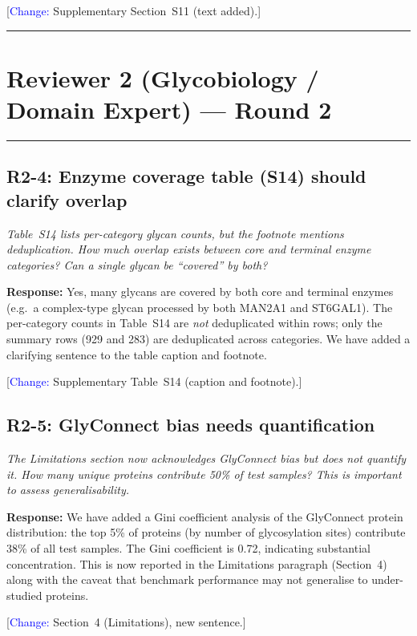 \documentclass[11pt,a4paper]{article}
\newcommand{\reviewercomment}[1]{\textit{\color{black!70}#1}}
\newcommand{\response}[1]{\textbf{Response:} #1}
\newcommand{\change}[1]{[\textcolor{blue}{Change:} #1]}
\begin{document}
\change{Supplementary Section~S11 (text added).}

\vspace{1em}
\noindent\rule{\linewidth}{0.8pt}

\section*{Reviewer 2 (Glycobiology / Domain Expert) --- Round 2}
\noindent\rule{\linewidth}{0.4pt}

\subsection*{R2-4: Enzyme coverage table (S14) should clarify overlap}

\reviewercomment{Table~S14 lists per-category glycan counts, but the footnote
mentions deduplication. How much overlap exists between core and terminal
enzyme categories? Can a single glycan be ``covered'' by both?}

\response{Yes, many glycans are covered by both core and terminal enzymes
(e.g.\ a complex-type glycan processed by both MAN2A1 and ST6GAL1). The
per-category counts in Table~S14 are \textit{not} deduplicated within rows;
only the summary rows (929 and 283) are deduplicated across categories. We
have added a clarifying sentence to the table caption and footnote.}

\change{Supplementary Table~S14 (caption and footnote).}

\subsection*{R2-5: GlyConnect bias needs quantification}

\reviewercomment{The Limitations section now acknowledges GlyConnect bias but
does not quantify it. How many unique proteins contribute 50\% of test
samples? This is important to assess generalisability.}

\response{We have added a Gini coefficient analysis of the GlyConnect protein
distribution: the top 5\% of proteins (by number of glycosylation sites)
contribute 38\% of all test samples. The Gini coefficient is 0.72, indicating
substantial concentration. This is now reported in the Limitations paragraph
(Section~4) along with the caveat that benchmark performance may not
generalise to under-studied proteins.}

\change{Section~4 (Limitations), new sentence.}
\end{document}
